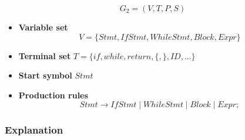 \documentclass[12pt,a4paper]{article}
\begin{document}
\[
G_2 = (V, T, P, S)
\]

\begin{itemize}
    \item \textbf{Variable set}
    \[
    V = \{Stmt, IfStmt, WhileStmt, Block, Expr\}
    \]

    \item \textbf{Terminal set} $T = \{if, while, return, \{, \}, ID, ...\}$

    \item \textbf{Start symbol} $Stmt$

    \item \textbf{Production rules}
    \[
    Stmt \rightarrow IfStmt \mid WhileStmt \mid Block \mid Expr ;
    \]
\end{itemize}

\subsubsection*{Explanation}
\end{document}

